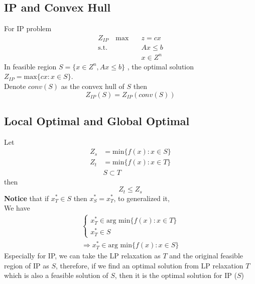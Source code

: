 			\subsection{IP and Convex Hull}
				For IP problem
				\begin{align}
					Z_{IP} \quad \text{max} \quad &z = cx  \\
							\text{s.t.} &Ax \le b \\
									&x\in {Z^n} 
				\end{align}
				In feasible region $S = \{x\in Z^n, Ax\le b\}$ , the optimal solution $Z_{IP} = \text{max}\{cx: x\in S\}$.\\
				Denote $conv(S)$ as the convex hull of $S$ then\\
				\begin{equation}Z_{IP}(S) = Z_{IP}(conv(S))  \end{equation}
				
			\subsection{Local Optimal and Global Optimal}
				Let 
				\begin{align}
					Z_s &= \text{min} \{f(x):x\in S\} \\
					Z_t &= \text{min} \{f(x):x\in T\}  \\
					& S \subset T 
				\end{align}
				then\\
				\begin{equation}Z_t \le Z_s  \end{equation}
				\textbf{Notice} that if $x_T^* \in S$ then $x_S^*=x_T^*$, to generalized it, \\
				We have
				\begin{align}
					\begin{cases}x_T^* \in \text{arg min} \{f(x): x\in T\} \\ x_T^* \in S\end{cases} \\ \Rightarrow x_T^*\in \text{arg min} \{f(x): x\in S\} 
				\end{align}
				Especially for IP, we can take the LP relaxation as $T$ and the original feasible region of IP as $S$, therefore, if we find an optimal solution from LP relaxation $T$ which is also a feasible solution of $S$, then it is the optimal solution for IP ($S$)
				
